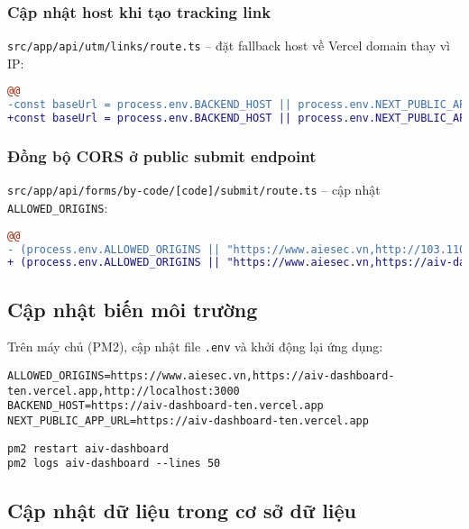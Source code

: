 \documentclass[12pt,a4paper]{article}
\begin{document}
\subsubsection{Cập nhật host khi tạo tracking link}
\texttt{src/app/api/utm/links/route.ts} – đặt fallback host về Vercel domain thay vì IP:
\begin{lstlisting}[language=diff,caption=Update generateTrackingLink]
@@
-const baseUrl = process.env.BACKEND_HOST || process.env.NEXT_PUBLIC_APP_URL || 'http://103.110.85.200:3000';
+const baseUrl = process.env.BACKEND_HOST || process.env.NEXT_PUBLIC_APP_URL || 'https://aiv-dashboard-ten.vercel.app';
\end{lstlisting}

\subsubsection{Đồng bộ CORS ở public submit endpoint}
\texttt{src/app/api/forms/by-code/[code]/submit/route.ts} – cập nhật \texttt{ALLOWED\_ORIGINS}:
\begin{lstlisting}[language=diff,caption=Update ALLOWED_ORIGINS cho submit route]
@@
- (process.env.ALLOWED_ORIGINS || "https://www.aiesec.vn,http://103.110.85.200:3000,http://localhost:3000")
+ (process.env.ALLOWED_ORIGINS || "https://www.aiesec.vn,https://aiv-dashboard-ten.vercel.app,http://localhost:3000")
\end{lstlisting}

\subsection{Cập nhật biến môi trường}

Trên máy chủ (PM2), cập nhật file \texttt{.env} và khởi động lại ứng dụng:
\begin{lstlisting}[caption=Cập nhật .env]
ALLOWED_ORIGINS=https://www.aiesec.vn,https://aiv-dashboard-ten.vercel.app,http://localhost:3000
BACKEND_HOST=https://aiv-dashboard-ten.vercel.app
NEXT_PUBLIC_APP_URL=https://aiv-dashboard-ten.vercel.app
\end{lstlisting}

\begin{lstlisting}[caption=Restart ứng dụng]
pm2 restart aiv-dashboard
pm2 logs aiv-dashboard --lines 50
\end{lstlisting}

\subsection{Cập nhật dữ liệu trong cơ sở dữ liệu}
\end{document}
